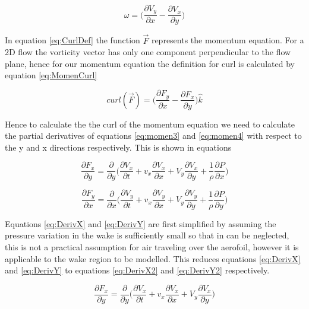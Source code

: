 \begin{equation}
\label{eq:VortDef}
\omega=\Big(\frac{\partial V_y}{\partial x}-\frac{\partial V_x}{\partial y}\Big)
\end{equation}

In equation \ref{eq:CurlDef} the function $\vec{F}$ represents the momentum equation. For a 2D flow the vorticity vector has only one component perpendicular to the flow plane, hence for our momentum equation the definition for curl is calculated by equation \ref{eq:MomenCurl}

\begin{equation}
\label{eq:MomenCurl}
curl(\vec{F})=\big(\frac{\partial F_y}{\partial x}-\frac{\partial F_x}{\partial y}\big)\hat{k}
\end{equation}

Hence to calculate the the curl of the momentum equation we need to calculate the partial derivatives of equations \ref{eq:momen3} and \ref{eq:momen4} with respect to the y and x directions respectively. This is shown in equations

\begin{equation}
\label{eq:DerivX}
\frac{\partial F_x}{\partial y} = \frac{\partial}{\partial y}\Big(\frac{\partial V_x}{\partial t}+v_x \frac{\partial V_x}{\partial x}+V_y \frac{\partial V_x}{\partial y}+\frac{1}{\rho}\frac{\partial P}{\partial x}\Big)
\end{equation}

\begin{equation}
\label{eq:DerivY}
\frac{\partial F_y}{\partial x} = \frac{\partial}{\partial x}\Big(\frac{\partial V_y}{\partial t}+v_x \frac{\partial V_y}{\partial x}+V_y \frac{\partial V_y}{\partial y}+\frac{1}{\rho}\frac{\partial P}{\partial y}\Big)
\end{equation}

Equations \ref{eq:DerivX} and \ref{eq:DerivY} are first simplified by assuming the pressure variation in the wake is sufficiently small so that in can be neglected, this is not a practical assumption for air traveling over the aerofoil, however it is applicable to the wake region to be modelled. This reduces equations \ref{eq:DerivX} and \ref{eq:DerivY} to equations \ref{eq:DerivX2} and \ref{eq:DerivY2} respectively.

\begin{equation}
\label{eq:DerivX2}
\frac{\partial F_x}{\partial y} = \frac{\partial}{\partial y}\Big(\frac{\partial V_x}{\partial t}+v_x \frac{\partial V_x}{\partial x}+V_y \frac{\partial V_x}{\partial y}\Big)
\end{equation}

